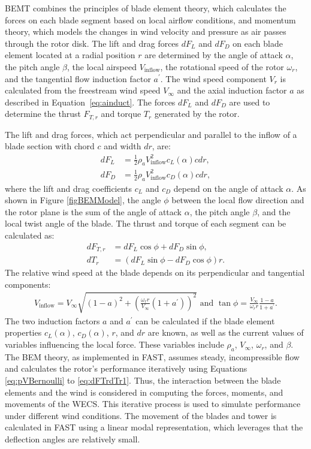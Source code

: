 BEMT combines the principles of blade element theory, which calculates the forces on each blade segment based on local airflow conditions, and momentum theory, which models the changes in wind velocity and pressure as air passes through the rotor disk. The lift and drag forces $dF_L$ and $dF_D$ on each blade element located at a radial position $r$ are determined by the angle of attack $\alpha$, the pitch angle $\beta$, the local airspeed $V_\text{inflow}$, the rotational speed of the rotor $\omega_r$, and the tangential flow induction factor $a^{\prime}$. The wind speed component $V_r$ is calculated from the freestream wind speed $V_{\infty}$ and the axial induction factor $a$ as described in Equation~\eqref{eq:ainduct}. The forces $dF_L$ and $dF_D$ are used to determine the thrust $F_{T,r}$ and torque $T_r$ generated by the rotor. 

The lift and drag forces, which act perpendicular and parallel to the inflow of a blade section with chord $c$ and width $dr$, are:
\begin{align} \label{eq:dFldFd}
    dF_L &= \frac{1}{2} \rho_a V^2_{\text{inflow}} c_L(\alpha)cdr,\\
    dF_D &= \frac{1}{2} \rho_a V^2_{\text{inflow}} c_D(\alpha)cdr,
\end{align}
where the lift and drag coefficients $c_L$ and $c_D$ depend on the angle of attack $\alpha$. As shown in Figure \ref{figBEMModel}, the angle $\phi$ between the local flow direction and the rotor plane is the sum of the angle of attack $\alpha$, the pitch angle $\beta$, and the local twist angle of the blade. The thrust and torque of each segment can be calculated as:
\begin{align} \label{eq:dFTrdTr}
    dF_{T,r} &= dF_{L}\cos\phi + dF_D \sin\phi,\\
    dT_r &= (dF_{L} \sin \phi - dF_D \cos\phi) r.
\end{align}
The relative wind speed at the blade depends on its perpendicular and tangential components:
\begin{align} \label{eq:dFTrdTr1}
    V_{\text{inflow}} = V_{\infty}\sqrt{(1-a)^2 + \left(\frac{\omega_{r}r}{ V_{\infty}}(1+a^{\prime})\right)^2}\text{ and } \tan \phi = \frac{V_{\infty}}{\omega_r r} \frac{1-a}{1+a^{\prime}}.
\end{align} %
The two induction factors $a$ and $a^{\prime}$ can be calculated if the blade element properties $c_L(\alpha)$, $c_D(\alpha)$, $r$, and $dr$ are known, as well as the current values of variables influencing the local force. These variables include $\rho_a$, $V_{\infty}$, $\omega_r$, and $\beta$. The BEM theory, as implemented in FAST, assumes steady, incompressible flow and calculates the rotor's performance iteratively using Equations \eqref{eq:pVBernoulli} to \eqref{eq:dFTrdTr1}. Thus, the interaction between the blade elements and the wind is considered in computing the forces, moments, and movements of the WECS. This iterative process is used to simulate performance under different wind conditions. The movement of the blades and tower is calculated in FAST using a linear modal representation, which leverages that the deflection angles are relatively small.

